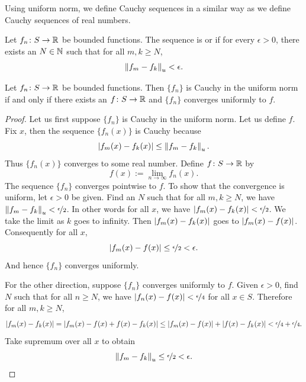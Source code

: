 Using uniform norm, we define Cauchy sequences in a similar way
as we define Cauchy sequences of real numbers.

\begin{defn}
Let $f_n \colon S \to {\mathbb{R}}$ be bounded functions.
The sequence is \emph{}
or \emph{}
if for every $\epsilon > 0$, there exists an $N \in {\mathbb{N}}$ such
that for all $m,k \geq N$,
\begin{equation*}
\left\lVert {f_m-f_k} \right\rVert_u < \epsilon .
\end{equation*}
\end{defn}

\begin{prop} \label{prop:uniformcauchy}
Let $f_n \colon S \to {\mathbb{R}}$ be bounded functions.
Then $\{ f_n \}$ is Cauchy in the uniform norm if and only if
there exists an $f \colon S \to {\mathbb{R}}$ and $\{ f_n \}$ converges
uniformly to $f$.
\end{prop}

\begin{proof}
Let us first suppose $\{ f_n \}$ is Cauchy in the uniform norm.
Let us define $f$.  Fix $x$, then
the sequence $\{ f_n(x) \}$ is Cauchy because
\begin{equation*}
\left\lvert {f_m(x)-f_k(x)} \right\rvert
\leq
\left\lVert {f_m-f_k} \right\rVert_u .
\end{equation*}
Thus $\{ f_n(x) \}$ converges to some real number.  Define $f \colon S
\to {\mathbb{R}}$ by
\begin{equation*}
f(x) := \lim_{n \to \infty} f_n(x) .
\end{equation*}
The sequence
$\{ f_n \}$ converges pointwise to $f$.  To show that the convergence
is uniform, let $\epsilon > 0$ be given.  Find an $N$ such that
for all $m, k \geq N$, we have
$\left\lVert {f_m-f_k} \right\rVert_u < \nicefrac{\epsilon}{2}$.  In other words for
all $x$, we have
$\left\lvert {f_m(x)-f_k(x)} \right\rvert < \nicefrac{\epsilon}{2}$.  We take the limit
as $k$ goes to infinity.  Then $\left\lvert {f_m(x)-f_k(x)} \right\rvert$
goes to $\left\lvert {f_m(x)-f(x)} \right\rvert$.
Consequently for all $x$,
\begin{equation*}
\left\lvert {f_m(x)-f(x)} \right\rvert \leq \nicefrac{\epsilon}{2} < \epsilon .
\end{equation*}
And hence $\{ f_n \}$ converges uniformly.

For the other direction, suppose $\{ f_n \}$ converges uniformly to
$f$.  Given $\epsilon > 0$, find $N$ such that for all $n \geq N$,
we have $\left\lvert {f_n(x)-f(x)} \right\rvert < \nicefrac{\epsilon}{4}$ for all $x \in S$.
Therefore for all $m, k \geq N$,
\begin{equation*}
\left\lvert {f_m(x)-f_k(x)} \right\rvert = 
\left\lvert {f_m(x)-f(x)+f(x)-f_k(x)} \right\rvert \leq
\left\lvert {f_m(x)-f(x)} \right\rvert+\left\lvert {f(x)-f_k(x)} \right\rvert < \nicefrac{\epsilon}{4} +
\nicefrac{\epsilon}{4} .
\end{equation*}
Take supremum over all $x$ to obtain
\begin{equation*}
\left\lVert {f_m-f_k} \right\rVert_u \leq \nicefrac{\epsilon}{2} < \epsilon .  \qedhere
\end{equation*}
\end{proof}

